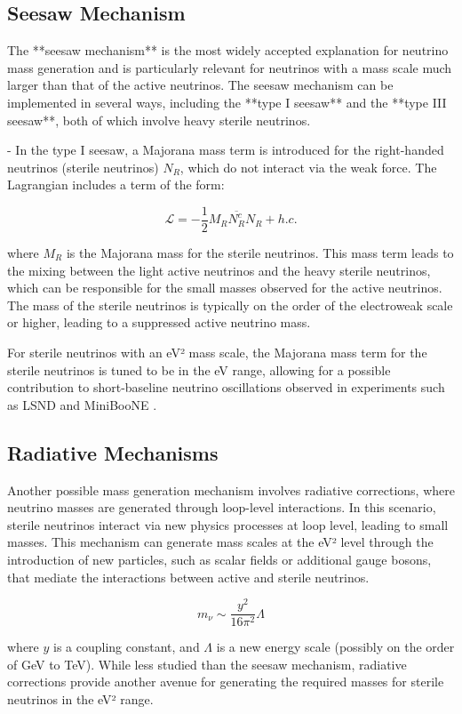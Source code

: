 \documentclass[a4paper,12pt,numbered]{article}
\begin{document}
\subsection{Seesaw Mechanism}

The **seesaw mechanism** is the most widely accepted explanation for neutrino mass generation and is particularly relevant for neutrinos with a mass scale much larger than that of the active neutrinos. The seesaw mechanism can be implemented in several ways, including the **type I seesaw** and the **type III seesaw**, both of which involve heavy sterile neutrinos.

- In the type I seesaw, a Majorana mass term is introduced for the right-handed neutrinos (sterile neutrinos) \( N_R \), which do not interact via the weak force. The Lagrangian includes a term of the form:

\[
\mathcal{L} = - \frac{1}{2} M_R \overline{N_R^c} N_R + h.c.
\]

where \( M_R \) is the Majorana mass for the sterile neutrinos. This mass term leads to the mixing between the light active neutrinos and the heavy sterile neutrinos, which can be responsible for the small masses observed for the active neutrinos. The mass of the sterile neutrinos is typically on the order of the electroweak scale or higher, leading to a suppressed active neutrino mass. 

For sterile neutrinos with an eV² mass scale, the Majorana mass term for the sterile neutrinos is tuned to be in the eV range, allowing for a possible contribution to short-baseline neutrino oscillations observed in experiments such as LSND and MiniBooNE \cite{LSND, MiniBooNE}.

\subsection{Radiative Mechanisms}

Another possible mass generation mechanism involves radiative corrections, where neutrino masses are generated through loop-level interactions. In this scenario, sterile neutrinos interact via new physics processes at loop level, leading to small masses. This mechanism can generate mass scales at the eV² level through the introduction of new particles, such as scalar fields or additional gauge bosons, that mediate the interactions between active and sterile neutrinos.

\[
m_\nu \sim \frac{y^2}{16\pi^2} \Lambda
\]

where \( y \) is a coupling constant, and \( \Lambda \) is a new energy scale (possibly on the order of GeV to TeV). While less studied than the seesaw mechanism, radiative corrections provide another avenue for generating the required masses for sterile neutrinos in the eV² range.
\end{document}
